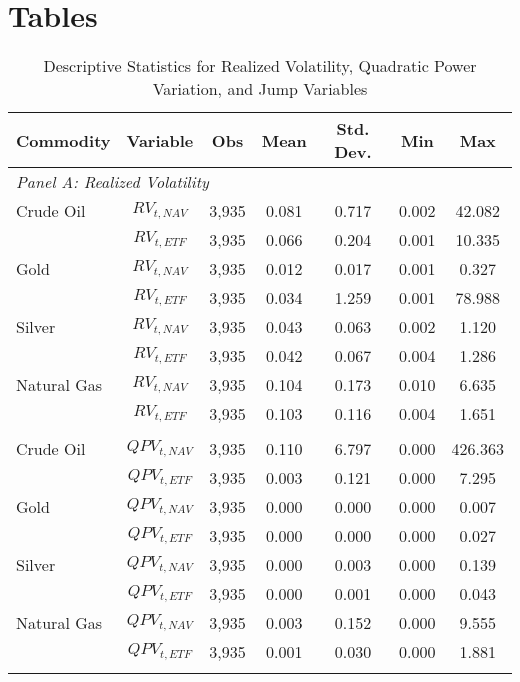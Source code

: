 
\section{Tables}

\begin{table}[htbp]
\centering
\caption{Descriptive Statistics for Realized Volatility, Quadratic Power Variation, and Jump Variables}
\label{tab:desc_stats_5min}
\begin{threeparttable}
\begin{tabular}{@{}lcccccc@{}}
\toprule
\multicolumn{1}{l}{Commodity} & Variable & Obs & Mean & Std. Dev. & Min & Max \\
\midrule
\multicolumn{7}{l}{\textit{Panel A: Realized Volatility}} \\
\addlinespace[0.1cm]
Crude Oil & $RV_{t,NAV}$ & 3,935 & 0.081 & 0.717 & 0.002 & 42.082 \\
          & $RV_{t,ETF}$ & 3,935 & 0.066 & 0.204 & 0.001 & 10.335 \\
\addlinespace[0.05cm]
Gold      & $RV_{t,NAV}$ & 3,935 & 0.012 & 0.017 & 0.001 & 0.327 \\
          & $RV_{t,ETF}$ & 3,935 & 0.034 & 1.259 & 0.001 & 78.988 \\
\addlinespace[0.05cm]
Silver    & $RV_{t,NAV}$ & 3,935 & 0.043 & 0.063 & 0.002 & 1.120 \\
          & $RV_{t,ETF}$ & 3,935 & 0.042 & 0.067 & 0.004 & 1.286 \\
\addlinespace[0.05cm]
Natural Gas & $RV_{t,NAV}$ & 3,935 & 0.104 & 0.173 & 0.010 & 6.635 \\
            & $RV_{t,ETF}$ & 3,935 & 0.103 & 0.116 & 0.004 & 1.651 \\
\addlinespace[0.2cm]

\multicolumn{7}{l}{\textit{Panel B: Quadratic Power Variation}} \\
\addlinespace[0.1cm]
Crude Oil & $QPV_{t,NAV}$ & 3,935 & 0.110 & 6.797 & 0.000 & 426.363 \\
          & $QPV_{t,ETF}$ & 3,935 & 0.003 & 0.121 & 0.000 & 7.295 \\
\addlinespace[0.05cm]
Gold      & $QPV_{t,NAV}$ & 3,935 & 0.000 & 0.000 & 0.000 & 0.007 \\
          & $QPV_{t,ETF}$ & 3,935 & 0.000 & 0.000 & 0.000 & 0.027 \\
\addlinespace[0.05cm]
Silver    & $QPV_{t,NAV}$ & 3,935 & 0.000 & 0.003 & 0.000 & 0.139 \\
          & $QPV_{t,ETF}$ & 3,935 & 0.000 & 0.001 & 0.000 & 0.043 \\
\addlinespace[0.05cm]
Natural Gas & $QPV_{t,NAV}$ & 3,935 & 0.003 & 0.152 & 0.000 & 9.555 \\
            & $QPV_{t,ETF}$ & 3,935 & 0.001 & 0.030 & 0.000 & 1.881 \\
\addlinespace[0.2cm]


\end{tabular}
\end{threeparttable}
\end{table}
